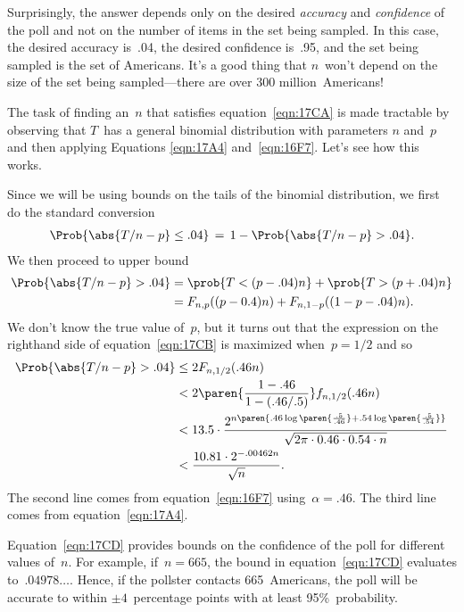 \begin{editingnotes}
Surprisingly, the answer depends only on the desired \emph{accuracy}
and \emph{confidence} of the poll and not on the number of items in
the set being sampled.  In this case, the desired accuracy is~.04, the
desired confidence is~.95, and the set being sampled is the set of
Americans.  It's a good thing that $n$~won't depend on the size of the
set being sampled---there are over 300 million~Americans!

The task of finding an~$n$ that satisfies equation~\eqref{eqn:17CA} is
made tractable by observing that $T$~has a general binomial
distribution with parameters $n$ and~$p$ and then applying Equations
\ref{eqn:17A4} and~\ref{eqn:16F7}.  Let's see how this works.

Since we will be using bounds on the tails of the binomial
distribution, we first do the standard conversion
\begin{equation*}
\Prob{\strut\abs{T/n - p} \le .04}
    \,=\, 1 - \Prob{\strut \abs{T/n - p} > .04}.
\end{equation*}
We then proceed to upper bound
\begin{align}
\Prob{\abs{T/n - p} > .04}
    & = \prob{T < (p - .04) n} + \prob{T > (p + .04) n} \notag\\
    &= F_{n, p}((p - 0.4)n) + F_{n, 1-p}((1 - p - .04) n).
        \label{eqn:17CB}
\end{align}
We don't know the true value of~$p$, but it turns out that the
expression on the righthand side of equation~\eqref{eqn:17CB} is
maximized when~$p = 1/2$ and so
\begingroup
\openup\jot
\begin{align}
\Prob{\strut \abs{T/n - p} > .04}
    &\le 2 F_{n, 1/2}(.46n) \notag\\
    &<   2 \paren{\frac{1 - .46}{1 - (.46/.5)}} f_{n, 1/2}(.46n)
        \notag\\
    &< 13.5 \cdot 
        \frac{ 2^{n \paren{.46 \log\paren{\frac{.5}{.46}}
                         + .54 \log\paren{\frac{.5}{.54}} } } }
             {\sqrt{2\pi \cdot 0.46 \cdot 0.54 \cdot n}} \notag\\
    & < \frac{ 10.81 \cdot 2^{-.00462 n} }{ \sqrt{n} }.
        \label{eqn:17CD}
\end{align}
\endgroup
The second line comes from equation~\eqref{eqn:16F7} using~$\alpha =
.46$.  The third line comes from equation~\eqref{eqn:17A4}.

Equation~\eqref{eqn:17CD} provides bounds on the confidence of the poll
for different values of~$n$.  For example, if~$n = 665$, the bound in
equation~\eqref{eqn:17CD} evaluates to~$.04978\dots$.  Hence, if the
pollster contacts 665~Americans, the poll will be accurate to within
$\pm 4$~percentage points with at least 95\%~probability.


\end{editingnotes}
